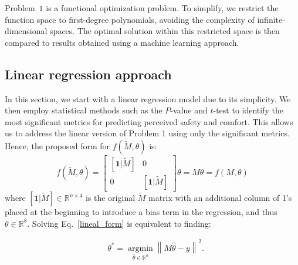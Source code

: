 \documentclass[lettersize,journal]{IEEEtran}
\begin{document}
Problem~$1$ is a functional optimization problem. To simplify, we restrict the function space to first-degree polynomials, avoiding the complexity of infinite-dimensional spaces. The optimal solution within this restricted space is then compared to results obtained using a machine learning approach.

\subsection{Linear regression approach}
\label{linear_regression_model}

In this section, we start with a linear regression model due to its simplicity. We then employ statistical methods such as the $P$-value and $t$-test \cite{pvaluecite} to identify the most significant metrics for predicting perceived safety and comfort. This allows us to address the linear version of Problem 1 using only the significant metrics. Hence, the proposed form for $ f(\tilde{M}, \theta)$ is:
\begin{equation}
\label{lineal_form}
    f(\tilde{M}, \theta) = \begin{bmatrix}
\left [\textbf{1}|\tilde{M} \right] & 0\\ 
0 & \left [\textbf{1}|\tilde{M} \right]
\end{bmatrix} \theta = M \theta  = f(M, \theta)
\end{equation}
where $[\textbf{1}|\tilde{M} ] \in \mathbb{R}^{n \times 4}$ is the original $\tilde{M}$ matrix with an additional column of 1's placed at the beginning to introduce a bias term in the regression, and thus $\theta \in \mathbb{R}^8$. Solving Eq.~\eqref{lineal_form} is equivalent to finding:

\begin{align}
        \label{normal_linear_regresion}
        &  \theta^{\ast} = \underset{\hat{\theta} \in \mathbb{R}^8}{\operatorname{argmin}}  \left\|  M \hat{\theta} - y \right\|^2.
\end{align}
\end{document}
